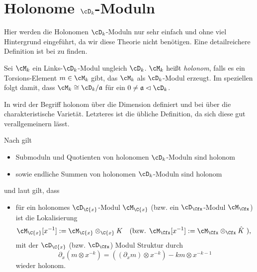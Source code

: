 \section{Holonome $\cD_k$-Moduln}
Hier werden die Holonomen $\cD_k$-Moduln nur sehr einfach und ohne viel
Hintergrund eingeführt, da wir diese Theorie nicht benötigen. Eine
detailreichere Definition ist bei \cite[Def. 3.3.1]{sabbah_cimpa90} zu finden.
\begin{defn}
Sei $\cM_k$ ein Links-$\cD_k$-Modul ungleich $\cD_k$. $\cM_k$ heißt
\emph{holonom}, falls es ein Torsions-Element $m\in\cM_k$ gibt, das $\cM_k$ als
$\cD_k$-Modul erzeugt. Im speziellen folgt damit, dass $\cM_k\cong
\cD_k/\mathfrak{a}$ für ein $0\neq\mathfrak{a}\vartriangleleft\cD_k$.
\end{defn}
\begin{bem}
\begin{comment}
Dies hier ist eine sehr vereinfachte, aber für unsere Zwecke völlig
ausreichende, Definition von holonom.
\end{comment}
In \cite{coutinho1995primer} wird der Begriff holonom über die Dimension
definiert und bei \cite{sabbah_cimpa90} über die charakteristische Varietät.
Letzteres ist die übliche Definition, da sich diese gut verallgemeinern lässt.
\end{bem}

\begin{bem} 
Nach \cite[Prop 10.1.1]{coutinho1995primer} gilt
\begin{itemize}
\item Submoduln und Quotienten von holonomen $\cD_k$-Moduln sind holonom
\item sowie endliche Summen von holonomen $\cD_k$-Moduln sind holonom
\end{itemize}
und laut \cite[Thm. 4.2.3]{sabbah_cimpa90} gilt, dass
\begin{itemize}
\item für ein holonomes $\cD_{\C\{x\}}$-Modul $\cM_{\C\{x\}}$
(bzw. ein $\cD_{\Cfx}$-Modul $\cM_{\Cfx}$)
ist die Lokalisierung
\begin{align*}
\cM_{\C\{x\}}[x^{-1}]&:=\cM_{\C\{x\}}\otimes_{\C\{x\}}K
&&\text{(bzw. }\cM_{\Cfx}[x^{-1}]:=\cM_{\Cfx}\otimes_{\Cfx}\hat K\text{ ),}
\end{align*}
mit der $\cD_{\C\{x\}}$ (bzw. $\cD_{\Cfx}$) Modul Struktur durch
\[
\partial_x(m\otimes x^{-k})=((\partial_xm)\otimes x^{-k})-km\otimes x^{-k-1}
\]
wieder holonom.
\end{itemize}
\end{bem}


